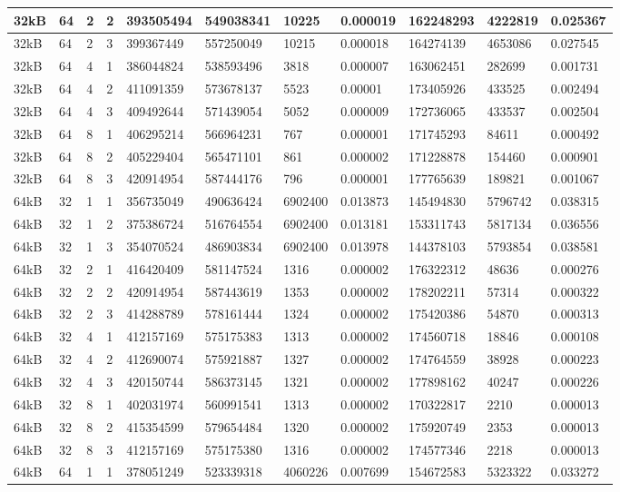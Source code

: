 \documentclass[conference]{IEEEtran}
\begin{document}
\begin{table}
\begin{tabular}{|m{.75cm} |m{.75cm} |m{.8cm} | m{.75cm} | l | l | l | l | l | l | l |}
        32kB&64&2&2&393505494&549038341&10225&0.000019&162248293&4222819&0.025367\\ \hline
        32kB&64&2&3&399367449&557250049&10215&0.000018&164274139&4653086&0.027545\\ \hline
        32kB&64&4&1&386044824&538593496&3818&0.000007&163062451&282699&0.001731\\ \hline
        32kB&64&4&2&411091359&573678137&5523&0.00001&173405926&433525&0.002494\\ \hline
        32kB&64&4&3&409492644&571439054&5052&0.000009&172736065&433537&0.002504\\ \hline
        32kB&64&8&1&406295214&566964231&767&0.000001&171745293&84611&0.000492\\ \hline
        32kB&64&8&2&405229404&565471101&861&0.000002&171228878&154460&0.000901\\ \hline
        32kB&64&8&3&420914954&587444176&796&0.000001&177765639&189821&0.001067\\ \hline
        64kB&32&1&1&356735049&490636424&6902400&0.013873&145494830&5796742&0.038315\\ \hline
        64kB&32&1&2&375386724&516764554&6902400&0.013181&153311743&5817134&0.036556\\ \hline
        64kB&32&1&3&354070524&486903834&6902400&0.013978&144378103&5793854&0.038581\\ \hline
        64kB&32&2&1&416420409&581147524&1316&0.000002&176322312&48636&0.000276\\ \hline
        64kB&32&2&2&420914954&587443619&1353&0.000002&178202211&57314&0.000322\\ \hline
        64kB&32&2&3&414288789&578161444&1324&0.000002&175420386&54870&0.000313\\ \hline
        64kB&32&4&1&412157169&575175383&1313&0.000002&174560718&18846&0.000108\\ \hline
        64kB&32&4&2&412690074&575921887&1327&0.000002&174764559&38928&0.000223\\ \hline
        64kB&32&4&3&420150744&586373145&1321&0.000002&177898162&40247&0.000226\\ \hline
        64kB&32&8&1&402031974&560991541&1313&0.000002&170322817&2210&0.000013\\ \hline
        64kB&32&8&2&415354599&579654484&1320&0.000002&175920749&2353&0.000013\\ \hline
        64kB&32&8&3&412157169&575175380&1316&0.000002&174577346&2218&0.000013\\ \hline
        64kB&64&1&1&378051249&523339318&4060226&0.007699&154672583&5323322&0.033272\\ \hline

\end{tabular}
\end{table}
\end{document}
